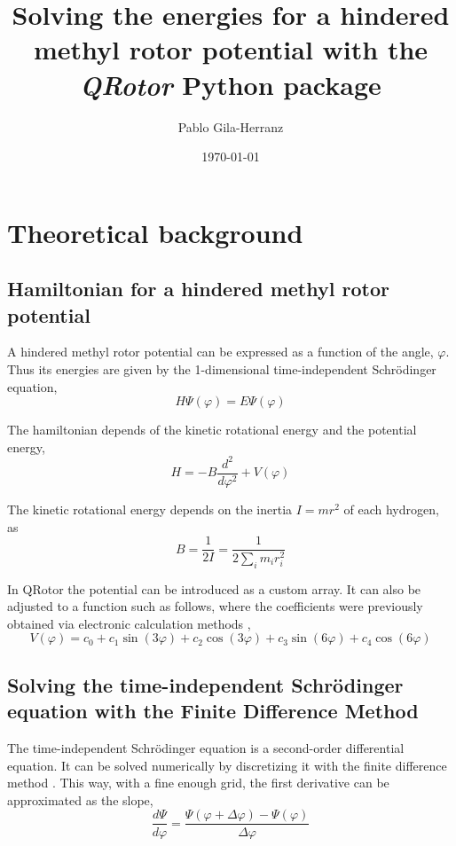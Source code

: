 \documentclass[12pt,a4paper]{article}
\title{Solving the energies for a hindered methyl rotor potential with the \textit{QRotor} Python package}
\author{Pablo Gila-Herranz}
\date{\today}
\begin{document}
\maketitle


\section*{Theoretical background}

\subsection*{Hamiltonian for a hindered methyl rotor potential}

A hindered methyl rotor potential can be expressed as a function of the angle, $\varphi$. Thus its energies are given by the 1-dimensional time-independent Schrödinger equation,
$$
H\Psi(\varphi)=E\Psi(\varphi)
$$

The hamiltonian depends of the kinetic rotational energy and the potential energy,
\begin{equation} \label{hamiltonian}
H = -B \frac{d^2}{d\varphi^2} + V(\varphi)
\end{equation}

The kinetic rotational energy depends on the inertia $I=mr^2$ of each hydrogen, as
\begin{equation} \label{b}
B = \frac{1}{2I}=\frac{1}{2\sum_{i}m_{i}r_{i}^{2}}
\end{equation}

In QRotor the potential can be introduced as a custom array. It can also be adjusted to a function such as follows, where the coefficients were previously obtained via electronic calculation methods \cite{titov2023},
$$
V(\varphi)=c_{0}+c_{1}\sin(3\varphi)+c_{2}\cos(3\varphi)+c_{3}\sin(6\varphi)+c_{4}\cos(6\varphi)
$$


\subsection*{Solving the time-independent Schrödinger equation with the Finite Difference Method}

The time-independent Schrödinger equation is a second-order differential equation.
It can be solved numerically by discretizing it with the finite difference method \cite{finite_diff_python}.
This way, with a fine enough grid, the first derivative can be approximated as the slope,
$$
\frac{d\Psi}{d\varphi} = \frac{\Psi(\varphi+\Delta\varphi)-\Psi(\varphi)}{\Delta\varphi}
$$
\end{document}
